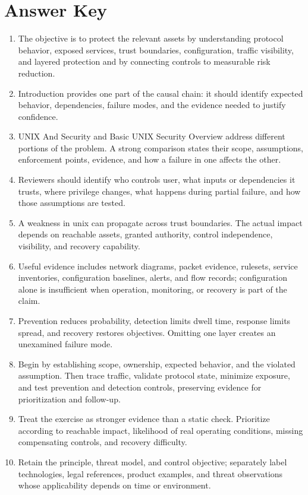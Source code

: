 \documentclass[11pt,letterpaper]{article}
\begin{document}
\section*{Answer Key}
\begin{enumerate}
\item The objective is to protect the relevant assets by understanding protocol behavior, exposed services, trust boundaries, configuration, traffic visibility, and layered protection and by connecting controls to measurable risk reduction.
\item Introduction provides one part of the causal chain: it should identify expected behavior, dependencies, failure modes, and the evidence needed to justify confidence.
\item UNIX And Security and Basic UNIX Security Overview address different portions of the problem. A strong comparison states their scope, assumptions, enforcement points, evidence, and how a failure in one affects the other.
\item Reviewers should identify who controls user, what inputs or dependencies it trusts, where privilege changes, what happens during partial failure, and how those assumptions are tested.
\item A weakness in unix can propagate across trust boundaries. The actual impact depends on reachable assets, granted authority, control independence, visibility, and recovery capability.
\item Useful evidence includes network diagrams, packet evidence, rulesets, service inventories, configuration baselines, alerts, and flow records; configuration alone is insufficient when operation, monitoring, or recovery is part of the claim.
\item Prevention reduces probability, detection limits dwell time, response limits spread, and recovery restores objectives. Omitting one layer creates an unexamined failure mode.
\item Begin by establishing scope, ownership, expected behavior, and the violated assumption. Then trace traffic, validate protocol state, minimize exposure, and test prevention and detection controls, preserving evidence for prioritization and follow-up.
\item Treat the exercise as stronger evidence than a static check. Prioritize according to reachable impact, likelihood of real operating conditions, missing compensating controls, and recovery difficulty.
\item Retain the principle, threat model, and control objective; separately label technologies, legal references, product examples, and threat observations whose applicability depends on time or environment.
\end{enumerate}
\end{document}
